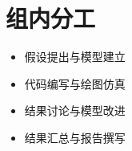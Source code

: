 \documentclass{article}
\begin{document}
	\section{组内分工}
	\begin{itemize}
		\item 假设提出与模型建立
		\item 代码编写与绘图仿真
		\item 结果讨论与模型改进
		\item 结果汇总与报告撰写
	\end{itemize}
	
%	
	
\end{document}
